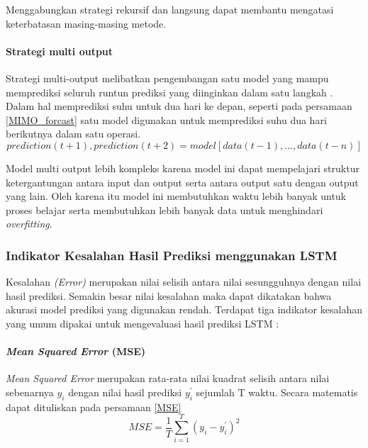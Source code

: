 \documentclass[../thesis.tex]{subfiles}
\begin{document}
Menggabungkan strategi rekursif dan langsung dapat membantu mengatasi keterbatasan masing-masing metode.

\paragraph{Strategi multi output}

Strategi multi-output melibatkan pengembangan satu model yang mampu memprediksi seluruh runtun prediksi yang diinginkan dalam satu langkah \cite{Forecast_Strategy}.
Dalam hal memprediksi suhu untuk dua hari ke depan, seperti pada persamaan \ref{MIMO_forcast} satu model digunakan untuk memprediksi suhu dua hari berikutnya dalam satu operasi.
\begin{equation} \label{MIMO_forcast}
		prediction(t+1), prediction(t+2) = model[data(t-1), ..., data(t-n)]
\end{equation}

Model multi output lebih kompleks karena model ini dapat mempelajari struktur ketergantungan antara input dan output serta antara output satu dengan output yang lain.
Oleh karena itu model ini membutuhkan waktu lebih banyak untuk proses belajar serta membutuhkan lebih banyak data untuk menghindari \textit{overfitting}.

\subsubsection{Indikator Kesalahan Hasil Prediksi menggunakan LSTM}
Kesalahan \textit{(Error)} merupakan nilai selisih antara nilai sesungguhnya dengan nilai hasil prediksi. Semakin besar nilai kesalahan maka dapat dikatakan bahwa akurasi model prediksi 
yang digunakan rendah. Terdapat tiga indikator kesalahan yang umum dipakai untuk mengevaluasi hasil prediksi LSTM \cite{LSTM_2}:

\paragraph{\textit{Mean Squared Error}  (MSE)} 

\textit{Mean Squared Error} merupakan rata-rata nilai kuadrat selisih antara nilai sebenarnya $y_i$ dengan nilai hasil prediksi $y^{'}_i$ sejumlah T waktu. Secara matematis dapat dituliskan pada persamaan \ref{MSE}
\begin{equation}\label{MSE}
	MSE = \frac {1}{T}\sum \limits_{i=1}^{T} {(y_i - y^{'}_i)^2}
\end{equation}
\end{document}
